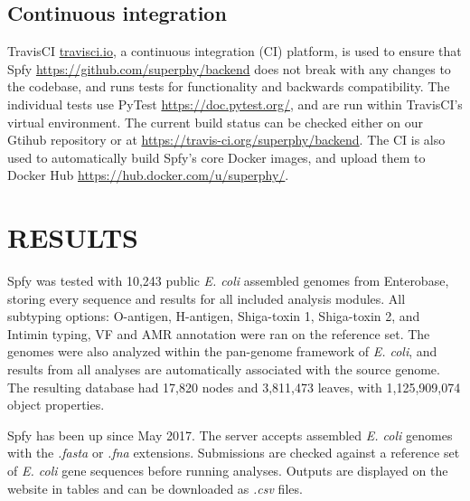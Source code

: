 \documentclass{article}
\begin{document}
\subsection{Continuous integration}

TravisCI \url{travisci.io}, a continuous integration (CI) platform, is used to ensure that Spfy \url{https://github.com/superphy/backend} does not break with any changes to the codebase, and runs tests for functionality and backwards compatibility.
The individual tests use PyTest \url{https://doc.pytest.org/}, and are run within TravisCI's virtual environment. The current build status can be checked either on our Gtihub repository or at \url{https://travis-ci.org/superphy/backend}.
The CI is also used to automatically build Spfy's core Docker images, and upload them to Docker Hub \url{https://hub.docker.com/u/superphy/}.

\section{RESULTS}
Spfy was tested with 10,243 public \textit{E. coli} assembled genomes from Enterobase, storing every sequence and results for all included analysis modules.
All subtyping options: O-antigen, H-antigen, Shiga-toxin 1, Shiga-toxin 2, and Intimin typing, VF and AMR annotation were ran on the reference set. The genomes were also analyzed within the pan-genome framework of \textit{E. coli}, and results from all analyses are automatically associated with the source genome.
The resulting database had 17,820 nodes and 3,811,473 leaves, with 1,125,909,074 object properties. \par

\small 

Spfy has been up since May 2017. The server accepts assembled \textit{E. coli} genomes with the \textit{.fasta} or \textit{.fna} extensions. Submissions are checked against a reference set of \textit{E. coli} gene sequences before running analyses. Outputs are displayed on the website in tables and can be downloaded as \textit{.csv} files. 
\par

\end{document}
